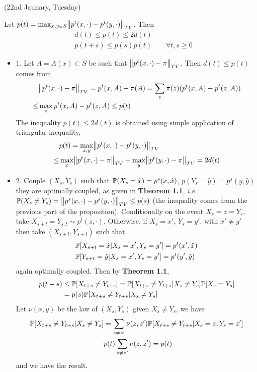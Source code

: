 \documentclass[12pt,a4paper]{article}
\newenvironment{proof}
{\begin{changemargin}{1cm}{0.5cm} 
	}%
	{\end{changemargin}
}
\renewenvironment{i}
{\begin{itemize} 
	}%
	{\end{itemize}
}
\begin{document}
\newday

(22nd Jaunary, Tuesday)
\s

 Let $p(t) = \max_{x,y\in S} \bigl\lVert p^t(x,\cdot) - p^t (y, \cdot)\bigr\rVert_{TV}$. Then 
\begin{align*}
& d (t) \leq p(t) \leq 2d(t) \\
& p(t+s) \leq p(s)p(t) \quad\quad \forall t,s\geq 0
\end{align*}
\begin{proof}
\pf 
\begin{i}
\item[1.] Let $A =A(x)\subset S$ be such that $\bigl\lVert p^t(x, \cdot) - \pi\bigr\rVert_{TV}$. Then $d(t)\leq p(t)$ comes from
\begin{align*}
& \bigl\lVert p^t(x, \cdot) -\pi\bigr\rVert_{TV} = p^t(x, A) - \pi(A) = \sum_{z} \pi(z) (p^t(x,A)- p^t(z,A)) \\
\leq & \max_z p^t(x, A) - p^t(z,A) \leq p(t)
\end{align*}
The inequality $p(t) \leq 2d(t)$ is obtained using simple application of triangular inequality,
\begin{align*}
& p(t) = \max_{x,y} \bigl\lVert p^t(x,\cdot) - p^t(y, \cdot)\bigr\rVert_{TV} \\
\leq & \max_x \bigl\lVert p^t(x, \cdot) - \pi\bigr\rVert_{TV} + \max_y \bigl\lVert p^t(y, \cdot) - \pi\bigr\rVert_{TV} = 2d(t)
\end{align*}
\item[2.] Couple $(X_s, Y_s)$ such that $\mathbb{P} (X_s = \hat{x}) = p^s(x, \hat{x})$, $p(Y_s = \hat{y}) = p^s(y, \hat{y})$ they are optimally coupled, as given in \textbf{Theorem 1.1}, \textit{i.e.} $\mathbb{P}(X_s \neq Y_s) = \bigl\lVert p^s(x, \cdot) - p^s(y, \cdot)\bigr\rVert_{TV} \leq p(s)$ (the inequality comes from the previous part of the proposition). Conditionally on the event $X_s = z = Y_s$, take $X_{s+t} = Y_{s,t} \sim p^t(z, \cdot)$. Otherwise, if $X_s = x'$, $Y_s = y'$, with $x' \neq y'$ then take $(X_{s+t}, Y_{s+t})$ such that
\begin{align*}
&\mathbb{P}[X_{s+t} = \hat{x} | X_s = x', Y_s = y'] =p^t(x', \hat{x}) \\
&\mathbb{P}[Y_{s+t} = \hat{y} | X_s = x', Y_s = y'] = p^t(y', \hat{y})
\end{align*}
again optimally coupled. Then by \textbf{Theorem 1.1},
\begin{align*}
p(t+s) &\leq \mathbb{P}[ X_{t+s} \neq Y_{t+s}] = \mathbb{P}[ X_{t+s} \neq Y_{t+s} | X_s \neq Y_s] \mathbb{P}[X_s =Y_s] \\
& = p(s)\mathbb{P}[ X_{t+s} \neq Y_{t+s} | X_s \neq Y_s]
\end{align*}
Let $\nu(x,y)$ be the law of $(X_{s}, Y_{s})$ given $X_s \neq Y_s$, we have
\begin{align*}
\mathbb{P}[ X_{t+s} \neq Y_{t+s} | X_s \neq Y_s] &= \sum_{z\neq z'} \nu(z,z') \mathbb{P}[X_{t+s} \neq Y_{t+s} | X_s = z, Y_s =z'] \\
& p(t) \sum_{z\neq z'} \nu(z,z') = p(t)
\end{align*}
and we have the result.
\end{i}
\eop
\end{proof}
\s
\end{document}
